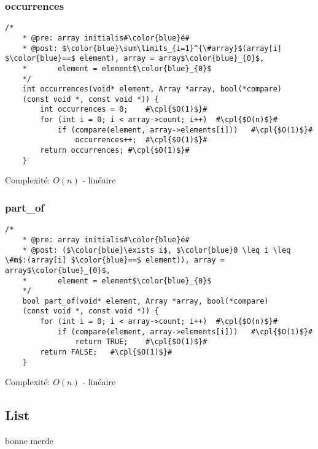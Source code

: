 \documentclass[a4paper, 11pt, oneside]{article}
\begin{document}
	\subsubsection{occurrences}
	\begin{lstlisting}[mathescape]
	/*
	* @pre: array initialis#\color{blue}é#
	* @post: $\color{blue}\sum\limits_{i=1}^{\#array}$(array[i] $\color{blue}==$ element), array = array$\color{blue}_{0}$,
	*		element = element$\color{blue}_{0}$
	*/
	int occurrences(void* element, Array *array, bool(*compare)
	(const void *, const void *)) {
		int occurrences = 0;	#\cpl{$O(1)$}#
		for (int i = 0; i < array->count; i++)	#\cpl{$O(n)$}#
			if (compare(element, array->elements[i]))	#\cpl{$O(1)$}#
				occurrences++;	#\cpl{$O(1)$}#
		return occurrences;	#\cpl{$O(1)$}#
	}
	\end{lstlisting}
	Complexité: $O(n)$ - linéaire
	
	\subsubsection{part\_of}
	\begin{lstlisting}[mathescape]
	/*
	* @pre: array initialis#\color{blue}é#
	* @post: ($\color{blue}\exists i$, $\color{blue}0 \leq i \leq \#m$:(array[i] $\color{blue}==$ element)), array = array$\color{blue}_{0}$,
	*		element = element$\color{blue}_{0}$
	*/
	bool part_of(void* element, Array *array, bool(*compare)    
	(const void *, const void *)) {
		for (int i = 0; i < array->count; i++)	#\cpl{$O(n)$}#
			if (compare(element, array->elements[i]))	#\cpl{$O(1)$}#
				return TRUE;	#\cpl{$O(1)$}#
		return FALSE;	#\cpl{$O(1)$}#
	}
	\end{lstlisting}
	Complexité: $O(n)$ - linéaire
	
	\subsection{List}
	\color{blue} bonne merde \color{black}
	
\end{document}
